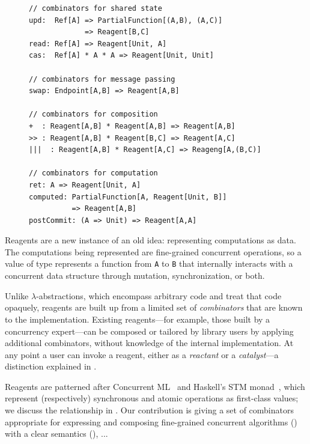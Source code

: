\documentclass[preprint]{sigplanconf}
\begin{document}
\begin{figure}
\begin{lstlisting}[mathescape=true,frame=single]
// combinators for shared state
upd:  Ref[A] => PartialFunction[(A,B), (A,C)] 
             => Reagent[B,C]
read: Ref[A] => Reagent[Unit, A]
cas:  Ref[A] * A * A => Reagent[Unit, Unit]

// combinators for message passing
swap: Endpoint[A,B] => Reagent[A,B]

// combinators for composition
+  : Reagent[A,B] * Reagent[A,B] => Reagent[A,B]
>> : Reagent[A,B] * Reagent[B,C] => Reagent[A,C]
|||  : Reagent[A,B] * Reagent[A,C] => Reageng[A,(B,C)]  

// combinators for computation
ret: A => Reagent[Unit, A]
computed: PartialFunction[A, Reagent[Unit, B]]
          => Reagent[A,B]
postCommit: (A => Unit) => Reagent[A,A]
\end{lstlisting}
\label{fig:combinators}
\end{figure}

Reagents are a new instance of an old idea: representing computations as data.
The computations being represented are fine-grained concurrent operations, so
a value of type  represents a function from \lstinline{A} to
\lstinline{B} that internally interacts with a concurrent data structure
through mutation, synchronization, or both.

Unlike $\lambda$-abstractions, which encompass arbitrary code and treat that
code opaquely, reagents are built up from a limited set of \emph{combinators}
that are known to the implementation.  Existing reagents---for example, those
built by a concurrency expert---can be composed or tailored by library users
by applying additional combinators, without knowledge of the internal
implementation.  At any point a user can invoke a reagent, either as a
\emph{reactant} or a \emph{catalyst}---a distinction explained in
.

Reagents are patterned after Concurrent ML~\cite{?} and Haskell's STM
monad~\cite{?}, which represent (respectively) synchronous and atomic
operations as first-class values; we discuss the relationship in
.
%
Our contribution is giving a set of combinators appropriate for expressing and
composing fine-grained concurrent algorithms () with a
clear semantics (), ... %


\end{document}
